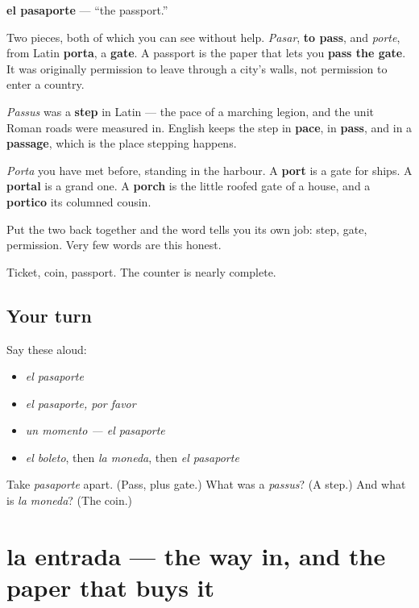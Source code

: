 \begin{cousinweb}
\textbf{el pasaporte} — \textquotedblleft{}the passport.\textquotedblright{}

Two pieces, both of which you can see without help. \emph{Pasar}, \textbf{to pass}, and \emph{porte}, from Latin \textbf{porta}, a \textbf{gate}. A passport is the paper that lets you \textbf{pass the gate}. It was originally permission to leave through a city's walls, not permission to enter a country.

\emph{Passus} was a \textbf{step} in Latin — the pace of a marching legion, and the unit Roman roads were measured in. English keeps the step in \textbf{pace}, in \textbf{pass}, and in a \textbf{passage}, which is the place stepping happens.

\emph{Porta} you have met before, standing in the harbour. A \textbf{port} is a gate for ships. A \textbf{portal} is a grand one. A \textbf{porch} is the little roofed gate of a house, and a \textbf{portico} its columned cousin.

Put the two back together and the word tells you its own job: step, gate, permission. Very few words are this honest.
\end{cousinweb}

\begin{grammarlens}[title={What you've built}]
Ticket, coin, passport. The counter is nearly complete.
\end{grammarlens}

\subsection*{Your turn}
Say these aloud:

\begin{itemize}
\raggedright
  \item \emph{el pasaporte}
  \item \emph{el pasaporte, por favor}
  \item \emph{un momento — el pasaporte}
  \item \emph{el boleto}, then \emph{la moneda}, then \emph{el pasaporte}
\end{itemize}

\begin{tcolorbox}[breakable,colback=teal!4,colframe=teal!35!black,title={Before you move on}]
Take \emph{pasaporte} apart. (Pass, plus gate.) What was a \emph{passus}? (A step.) And what is \emph{la moneda}? (The coin.)
\end{tcolorbox}
\section[la entrada]{la entrada — the way in, and the paper that buys it}

